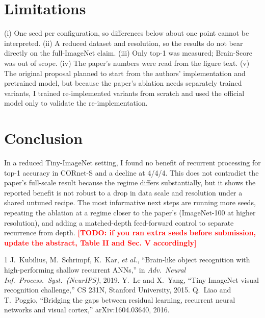 \documentclass[conference]{IEEEtran}
\newcommand{\todo}[1]{\textcolor{red}{\textbf{[TODO: #1]}}}
\begin{document}
\section{Limitations}
(i) One seed per configuration, so differences below about one point cannot be interpreted. (ii) A reduced dataset and resolution, so the results do not bear directly on the full-ImageNet claim. (iii) Only top-1 was measured; Brain-Score was out of scope. (iv) The paper's numbers were read from the figure text. (v) The original proposal planned to start from the authors' implementation and pretrained model, but because the paper's ablation needs separately trained variants, I trained re-implemented variants from scratch and used the official model only to validate the re-implementation.

\section{Conclusion}
In a reduced Tiny-ImageNet setting, I found no benefit of recurrent processing for top-1 accuracy in CORnet-S and a decline at 4/4/4. This does not contradict the paper's full-scale result because the regime differs substantially, but it shows the reported benefit is not robust to a drop in data scale and resolution under a shared untuned recipe. The most informative next steps are running more seeds, repeating the ablation at a regime closer to the paper's (ImageNet-100 at higher resolution), and adding a matched-depth feed-forward control to separate recurrence from depth. \todo{if you ran extra seeds before submission, update the abstract, Table II and Sec. V accordingly}

\begin{thebibliography}{1}
 J.~Kubilius, M.~Schrimpf, K.~Kar, \emph{et al.}, ``Brain-like object recognition with high-performing shallow recurrent ANNs,'' in \emph{Adv.\ Neural Inf.\ Process.\ Syst.\ (NeurIPS)}, 2019.
 Y.~Le and X.~Yang, ``Tiny ImageNet visual recognition challenge,'' CS 231N, Stanford University, 2015.
 Q.~Liao and T.~Poggio, ``Bridging the gaps between residual learning, recurrent neural networks and visual cortex,'' arXiv:1604.03640, 2016.
\end{thebibliography}
\end{document}
